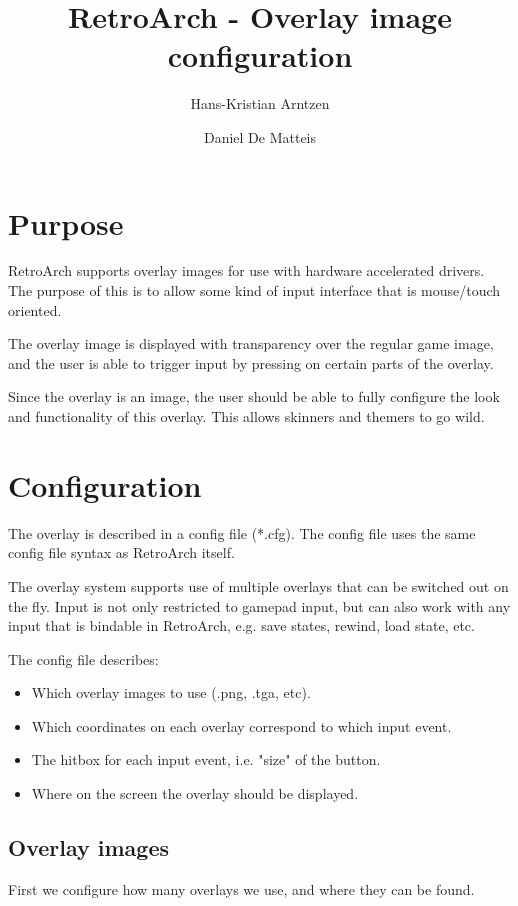 \documentclass[a4paper, 11pt]{article}
\title{RetroArch - Overlay image configuration}
\author{
Hans-Kristian Arntzen
\and
Daniel De Matteis}
\begin{document}
\maketitle

\section*{Purpose}

RetroArch supports overlay images for use with hardware accelerated drivers.
The purpose of this is to allow some kind of input interface that is mouse/touch oriented.

The overlay image is displayed with transparency over the regular game image, and the user is able to trigger input by pressing on certain parts of the overlay.

Since the overlay is an image, the user should be able to fully configure the look and functionality of this overlay. This allows skinners and themers to go wild.

\section*{Configuration}

The overlay is described in a config file (*.cfg). The config file uses the same config file syntax as RetroArch itself.

The overlay system supports use of multiple overlays that can be switched out on the fly. Input is not only restricted to gamepad input, but can also work with any input that is bindable in RetroArch, e.g. save states, rewind, load state, etc.

The config file describes:
\begin{itemize}
  \item Which overlay images to use (.png, .tga, etc).
  \item Which coordinates on each overlay correspond to which input event.
  \item The hitbox for each input event, i.e. "size" of the button.
  \item Where on the screen the overlay should be displayed.
\end{itemize}  


\subsection*{Overlay images}

First we configure how many overlays we use, and where they can be found.
\end{document}
